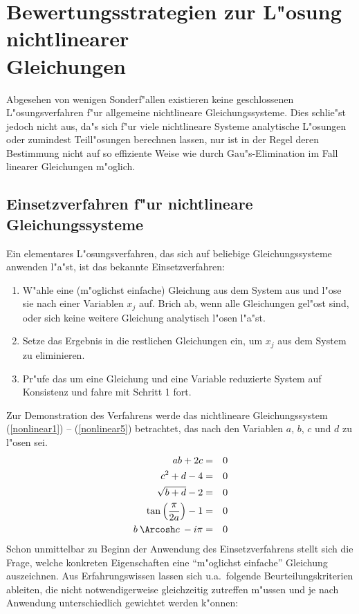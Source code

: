 \section[Bewertungsstrategien zur L"osung nichtlinearer Gleichungen]%
{Bewertungsstrategien zur L"osung nichtlinearer\\ Gleichungen}

Abgesehen von wenigen Sonderf"allen existieren keine geschlossenen 
L"osungsverfahren f"ur allgemeine nichtlineare Gleichungssysteme. Dies 
schlie"st jedoch nicht aus, da"s sich f"ur viele nichtlineare Systeme 
analytische L"osungen oder zumindest Teill"osungen berechnen lassen, nur 
ist in der Regel deren Bestimmung nicht auf so effiziente Weise wie durch 
Gau"s-Elimination im Fall linearer Gleichungen m"oglich.

\subsection{\label{Einsetzverfahren}Einsetzverfahren f"ur nichtlineare
Gleichungssysteme}

Ein elementares L"osungsverfahren, das sich auf beliebige 
Gleichungssysteme anwenden l"a"st, ist das bekannte Einsetzverfahren: 
\begin{enumerate}
\item W"ahle eine (m"oglichst einfache) Gleichung aus dem System aus und 
l"ose sie nach einer Variablen $x_j$ auf. Brich ab, wenn alle 
Gleichungen gel"ost sind, oder sich keine weitere Gleichung analytisch 
l"osen l"a"st.
\item Setze das Ergebnis in die restlichen Gleichungen ein, um $x_j$
aus dem System zu eliminieren.
\item Pr"ufe das um eine Gleichung und eine Variable reduzierte System
auf Konsistenz und fahre mit Schritt 1 fort.
\end{enumerate}
Zur Demonstration des Verfahrens werde das nichtlineare 
Gleichungssystem (\ref{nonlinear1}) -- (\ref{nonlinear5}) betrachtet, 
das nach den Variablen $a$, $b$, $c$ und $d$ zu l"osen sei. 
\begin{eqnarray}
                                ab + 2c &=& 0  \label{nonlinear1} \\
                           c^2 + d -  4 &=& 0  \label{nonlinear2} \\
                      \sqrt{b + d} -  2 &=& 0  \\
\tan \left( \frac{\pi}{2a} \right) -  1 &=& 0  \label{nonlinear4} \\
              b \: \Arcosh c \: - i \pi &=& 0  \label{nonlinear5}
\end{eqnarray}
Schon unmittelbar zu Beginn der Anwendung des Einsetzverfahrens stellt
sich die Frage, welche konkreten Eigenschaften eine ``m"oglichst
einfache'' Gleichung auszeichnen. Aus Erfahrungswissen lassen sich
u.a.\ folgende Beurteilungskriterien ableiten, die nicht
notwendigerweise gleichzeitig zutreffen m"ussen und je nach Anwendung 
unterschiedlich gewichtet werden k"onnen: 

